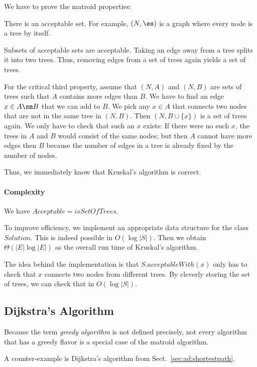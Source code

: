 We have to prove the matroid properties:
\begin{compactitem}
 \item There is an acceptable set. For example, $(N,\es)$ is a graph where every node is a tree by itself.
 \item Subsets of acceptable sets are acceptable. Taking an edge away from a tree splits it into two trees. Thus, removing edges from a set of trees again yields a set of trees.
 \item For the critical third property, assume that $(N,A)$ and $(N,B)$ are sets of trees such that $A$ contains more edges than $B$.
  We have to find an edge $x\in A\sm B$ that we can add to $B$.
  We pick any $x\in A$ that connects two nodes that are not in the same tree in $(N,B)$.
  Then $(N,B\cup\{x\})$ is a set of trees again.
  We only have to check that such an $x$ exists: If there were no such $x$, the trees in $A$ and $B$ would consist of the same nodes; but then $A$ cannot have more edges then $B$ because the number of edges in a tree is already fixed by the number of nodes.
\end{compactitem}

Thus, we immediately know that Kruskal's algorithm is correct.

\paragraph{Complexity}
We have $Acceptable=isSetOfTrees$.

To improve efficiency, we implement an appropriate data structure for the class $Solution$.
This is indeed possible in $O(\log|S|)$.
Then we obtain $\Theta(|E|\log|E|)$ as the overall run time of Kruskal's algorithm.

The idea behind the implementation is that $S.acceptableWith(x)$ only has to check that $x$ connects two nodes from different trees.
By cleverly storing the set of trees, we can check that in $O(\log|S|)$.

\subsection{Dijkstra's Algorithm}

Because the term \emph{greedy algorithm} is not defined precisely, not every algorithm that has a greedy flavor is a special case of the matroid algorithm.

A counter-example is Dijkstra's algorithm from Sect.~\ref{sec:ad:shortestpath}.

